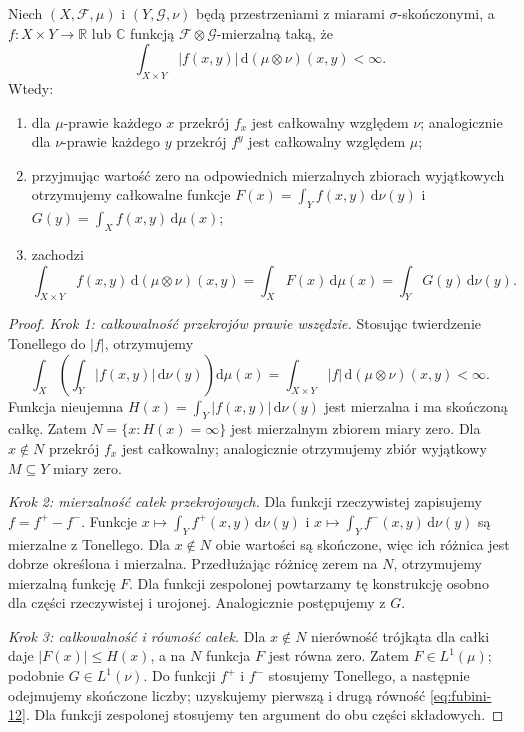 \begin{twierdzenie}[Fubini]
\label{thm:fubini-12}
Niech $(X,\mathcal F,\mu)$ i $(Y,\mathcal G,\nu)$
będą przestrzeniami z miarami $\sigma$-skończonymi,
a $f:X\times Y\to\mathbb R$ lub $\mathbb C$ funkcją
$\mathcal F\otimes\mathcal G$-mierzalną taką, że
\begin{equation}\label{eq:abs-fubini-12}
\int_{X\times Y}|f(x,y)|\,\mathrm d(\mu\otimes\nu)(x,y)<\infty.
\end{equation}
Wtedy:
\begin{enumerate}[label=\textup{(\roman*)}]
\item dla $\mu$-prawie każdego $x$ przekrój $f_x$ jest
      całkowalny względem $\nu$; analogicznie dla
      $\nu$-prawie każdego $y$ przekrój $f^y$ jest
      całkowalny względem $\mu$;
\item przyjmując wartość zero na odpowiednich
      mierzalnych zbiorach wyjątkowych otrzymujemy
      całkowalne funkcje
      $F(x)=\int_Y f(x,y)\,\mathrm d\nu(y)$ i
      $G(y)=\int_X f(x,y)\,\mathrm d\mu(x)$;
\item zachodzi
\begin{equation}\label{eq:fubini-12}
\int_{X\times Y}f(x,y)\,\mathrm d(\mu\otimes\nu)(x,y)
=\int_XF(x)\,\mathrm d\mu(x)
=\int_YG(y)\,\mathrm d\nu(y).
\end{equation}
\end{enumerate}
\end{twierdzenie}
\begin{proof}
\emph{Krok 1: całkowalność przekrojów prawie wszędzie.}
Stosując twierdzenie Tonellego do $|f|$,
otrzymujemy
\[
\int_X\left(\int_Y|f(x,y)|\,\mathrm d\nu(y)\right)
\mathrm d\mu(x)
=\int_{X\times Y}|f|\,\mathrm d(\mu\otimes\nu)(x,y)<\infty.
\]
Funkcja nieujemna $H(x)=\int_Y|f(x,y)|\,\mathrm d\nu(y)$
jest mierzalna i ma skończoną całkę. Zatem
$N=\{x:H(x)=\infty\}$ jest mierzalnym zbiorem
miary zero. Dla $x\notin N$ przekrój $f_x$
jest całkowalny; analogicznie otrzymujemy zbiór
wyjątkowy $M\subseteq Y$ miary zero.

\emph{Krok 2: mierzalność całek przekrojowych.}
Dla funkcji rzeczywistej zapisujemy $f=f^+-f^-$.
Funkcje $x\mapsto\int_Y f^+(x,y)\,\mathrm d\nu(y)$
i $x\mapsto\int_Y f^-(x,y)\,\mathrm d\nu(y)$
są mierzalne z Tonellego. Dla $x\notin N$
obie wartości są skończone, więc ich różnica
jest dobrze określona i mierzalna. Przedłużając
różnicę zerem na $N$, otrzymujemy mierzalną
funkcję $F$. Dla funkcji zespolonej powtarzamy
tę konstrukcję osobno dla części rzeczywistej
i urojonej. Analogicznie postępujemy z $G$.

\emph{Krok 3: całkowalność i równość całek.}
Dla $x\notin N$ nierówność trójkąta dla całki
daje $|F(x)|\le H(x)$, a na $N$ funkcja $F$
jest równa zero. Zatem $F\in L^1(\mu)$;
podobnie $G\in L^1(\nu)$.
Do funkcji $f^+$ i $f^-$ stosujemy Tonellego,
a następnie odejmujemy skończone liczby;
uzyskujemy pierwszą i drugą równość
\eqref{eq:fubini-12}. Dla funkcji zespolonej
stosujemy ten argument do obu części składowych.
\end{proof}

